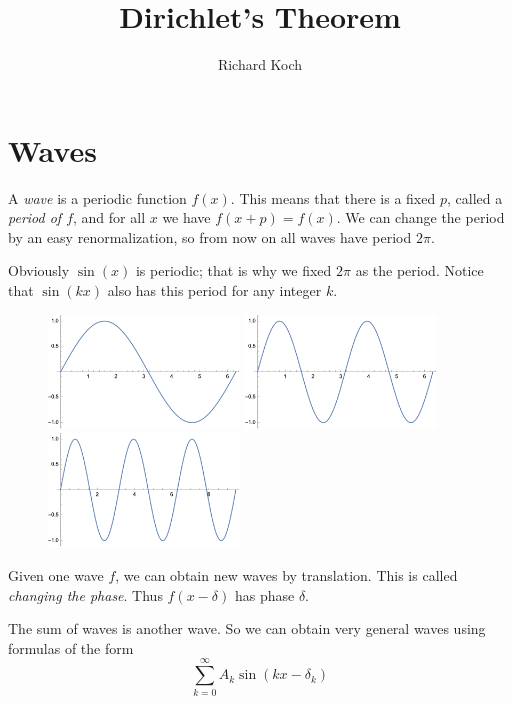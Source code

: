 \documentclass[11pt, oneside]{amsart}
\title{Dirichlet's Theorem}
\author{Richard Koch}
\begin{document}
\maketitle

\section{Waves} 

A {\em wave} is a periodic function $f(x)$. This means that there is a fixed $p$, called a  {\em period of $f$}, and for all $x$ we have $f(x + p) = f(x)$. We can change the period by an easy renormalization, so from now on all waves have period $2 \pi$.

Obviously $\sin(x)$ is periodic; that is why we fixed $2 \pi$ as the period. Notice that $\sin(kx)$ also has this period for any integer $k$. 

\begin{figure}[htbp] %
   \centering
   \includegraphics[width=2in]{Graphics/sin1} \hspace{.5in}   \includegraphics[width=2in]{Graphics/sin2}
    \hspace{.5in}   \includegraphics[width=2in]{Graphics/sin3}
\end{figure}

Given one wave $f$, we can obtain new waves by translation. This is called {\em changing the phase}.
Thus $f(x - \delta)$ has phase $\delta$. 

The sum of  waves is another wave. So we can obtain very general waves using formulas of the form
$$\sum_{k = 0}^\infty A_k \sin(kx - \delta_k)$$
\end{document}
